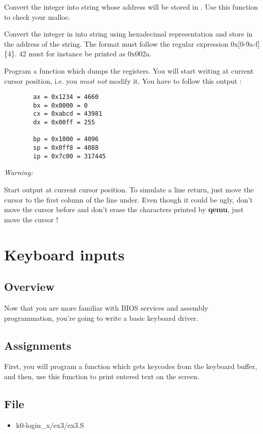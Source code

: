 {
  Convert the integer  into string whose address will be
  stored in . Use this function to check your malloc.
}

{
  Convert the integer in  into string using hexadecimal
  representation and store in  the address of the string.
  The format must follow the regular expression 0x[0-9a-f]\{4\}.
  42 must for instance be printed as 0x002a.
}

{
  Program a function which dumps the registers. You will start writing
  at current cursor position, i.e. you \emph{must not} modify it. You have to
  follow this output :
}
\begin{verbatim}
        ax = 0x1234 = 4660
        bx = 0x0000 = 0
        cx = 0xabcd = 43981
        dx = 0x00ff = 255

        bp = 0x1000 = 4096
        sp = 0x0ff8 = 4088
        ip = 0x7c00 = 317445
\end{verbatim}

\function{}{}
{
  {\em Warning:}

  Start output at current cursor position. To simulate a line return, just move
  the cursor to the first column of the line under. Even though it could be
  ugly, don't move the cursor before and don't erase the characters printed by
  \textbf{qemu}, just move the cursor !
}

%
%

\newpage

\section{Keyboard inputs}

\subsection*{Overview}
Now that you are more familiar with BIOS services and assembly programmation,
you're going to write a basic keyboard driver.

\subsection*{Assignments}
First, you will program a function which gets keycodes from the keyboard
buffer, and then, use this function to print entered text on the screen.

\subsection*{File}
\begin{itemize}
  \item k0-login\_x/ex3/ex3.S
\end{itemize}

